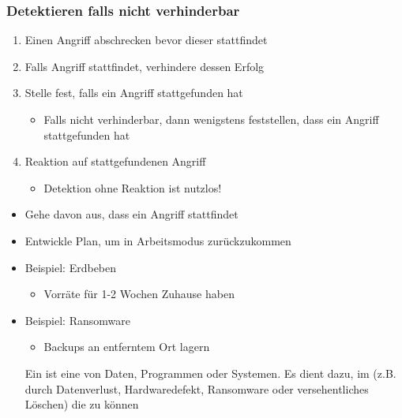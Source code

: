 \subsubsection*{Detektieren falls nicht verhinderbar}
\begin{enumerate}
    \item {} Einen Angriff abschrecken bevor dieser stattfindet
    \item {} Falls Angriff stattfindet, verhindere dessen Erfolg
    \item {} Stelle fest, falls ein Angriff stattgefunden hat
    \begin{itemize}
        \item Falls nicht verhinderbar, dann wenigstens feststellen, dass ein Angriff stattgefunden hat
    \end{itemize}
    \item {} Reaktion auf stattgefundenen Angriff
    \begin{itemize}
        \item Detektion ohne Reaktion ist nutzlos!
    \end{itemize}
\end{enumerate}
\begin{itemize}
    \item Gehe davon aus, dass ein Angriff stattfindet
    \item Entwickle Plan, um in Arbeitsmodus zurückzukommen
    \item Beispiel: Erdbeben %
    \begin{itemize}
        \item Vorräte für 1-2 Wochen Zuhause haben
    \end{itemize}
    \item Beispiel: Ransomware
    \begin{itemize}
        \item Backups an entferntem Ort lagern
    \end{itemize}
    \begin{infoBox}[title=Backups]
        Ein  ist eine  von Daten, Programmen oder Systemen. Es dient dazu, im  (z.B. durch Datenverlust, Hardwaredefekt, Ransomware oder versehentliches Löschen) die  zu können
    \end{infoBox}
\end{itemize}
